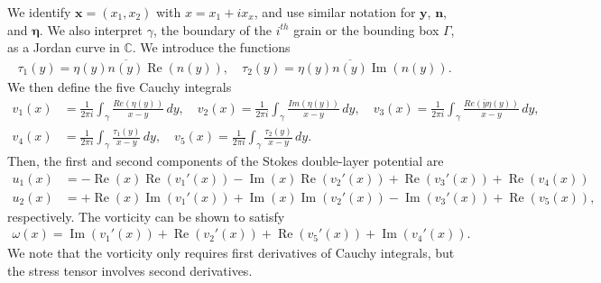 \documentclass[3p]{elsarticle}
\newcommand{\CC}{{\mathbb{C}}}
\newcommand{\eeta}{{\boldsymbol\eta}}
\newcommand{\nn}{{\mathbf{n}}}
\renewcommand{\Re}{{\operatorname{Re}}}
\renewcommand{\Im}{{\operatorname{Im}}}
\newcommand{\xx}{{\mathbf{x}}}
\newcommand{\yy}{{\mathbf{y}}}
\begin{document}
We identify $\xx = (x_1,x_2)$ with $x = x_1 + ix_x$, and use similar
notation for $\yy$, $\nn$, and $\eeta$. We also interpret $\gamma$, the
boundary of the $i^{th}$ grain or the bounding box $\Gamma$, as a Jordan
curve in $\CC$. We introduce the functions
\begin{align}
  \tau_1(y) = \eta(y) \overline{n(y)} \Re(n(y)), \quad 
  \tau_2(y) = \eta(y) \overline{n(y)} \Im(n(y)).
\end{align}
We then define the five Cauchy integrals
\begin{align}
  v_1(x) &= \frac{1}{2\pi i} \int_{\gamma} \frac{Re(\eta(y))}{x-y} \,dy, 
  \quad
  v_2(x) = \frac{1}{2\pi i} \int_{\gamma} \frac{Im(\eta(y))}{x-y} \, dy, 
  \quad
  v_3(x) = \frac{1}{2\pi i} \int_{\gamma} \frac{Re(\overline{y}\eta(y))}{x-y} \, dy, \\
  v_4(x) &= \frac{1}{2\pi i} \int_{\gamma} \frac{\tau_1(y)}{x-y} \, dy,
  \quad
  v_5(x) = \frac{1}{2\pi i} \int_{\gamma} \frac{\tau_2(y)}{x-y} \, dy.
\end{align}
Then, the first and second components of the Stokes double-layer
potential are
\begin{align}
  u_1(x) &= -\Re(x)\Re(v_1'(x)) - \Im(x)\Re(v_2'(x)) + 
           \Re(v_3'(x)) + \Re(v_4(x)) \\
  u_2(x) &= +\Re(x)\Im(v_1'(x)) + \Im(x)\Im(v_2'(x)) - 
           \Im(v_3'(x)) + \Re(v_5(x)),
\end{align}
respectively. The vorticity can be shown to satisfy
\begin{align}
  \omega(x) = \Im(v_1'(x)) + \Re(v_2'(x)) + 
     \Re(v_5'(x)) + \Im(v_4'(x)).
\end{align}
We note that the vorticity only requires first derivatives of Cauchy
integrals, but the stress tensor involves second derivatives.
\end{document}
